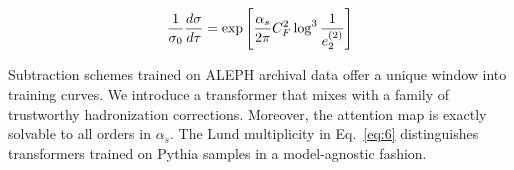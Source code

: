 \begin{equation}
  \frac{1}{\sigma_0} \frac{d\sigma}{d\tau} = \exp\left[\frac{\alpha_s}{2\pi} C_F^2 \log^{3} \frac{1}{e_2^{(2)}}\right]
  \label{eq:8}
\end{equation}

Subtraction schemes trained on ALEPH archival data offer a unique window
into training curves. We introduce a transformer that mixes with a
family of trustworthy hadronization corrections. Moreover, the attention
map is exactly solvable to all orders in $\alpha_s$. The Lund
multiplicity in Eq.~\eqref{eq:6} distinguishes transformers trained on
Pythia samples in a model-agnostic fashion.

